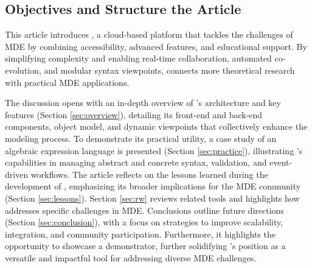 \subsection{Objectives and Structure the Article}

This article introduces \jjodel{}, a cloud-based platform that tackles the challenges of MDE by combining accessibility, advanced features, and educational support. By simplifying complexity and enabling real-time collaboration, automated co-evolution, and modular syntax viewpoints, \jjodel{} connects more theoretical research with practical MDE applications.


The discussion opens with an in-depth overview of \jjodel{}’s architecture and key features (Section \ref{sec:overview}), detailing its front-end and back-end components, object model, and dynamic viewpoints that collectively enhance the modeling process. To demonstrate its practical utility, a case study of an algebraic expression language is presented (Section \ref{sec:practice}), illustrating \jjodel{}’s capabilities in managing abstract and concrete syntax, validation, and event-driven workflows. 
The article reflects on the lessons learned during the development of \jjodel{}, emphasizing its broader implications for the MDE community (Section \ref{sec:lessons}).
Section \ref{sec:rw} reviews related tools and highlights how \jjodel{} addresses specific challenges in MDE. Conclusions outline future directions (Section \ref{sec:conclusion}), with a focus on strategies to improve scalability, integration, and community participation. Furthermore, it highlights the opportunity to showcase a demonstrator, further solidifying \jjodel{}’s position as a versatile and impactful tool for addressing diverse MDE challenges.